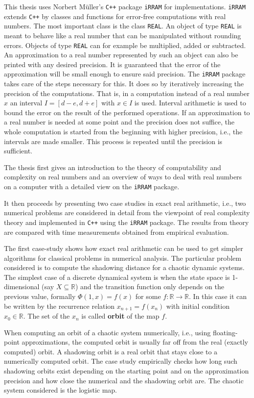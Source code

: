 \documentclass[]{article}
\newcommand{\RR}{\mathbb R}
\newcommand{\code}{\texttt}
\newcommand{\cc}{\code{C++}\xspace}
\newcommand{\irram}{\code{iRRAM}\xspace}
\newcommand{\real}{\code{REAL}\xspace}
\begin{document}
This thesis uses Norbert M\"{u}ller's \cc package \irram for implementations.
\irram extends \cc by classes and functions for error-free computations with
real numbers.
The most important class is the class \real. An object of type \real is meant
to behave like a  real number that can be manipulated without rounding errors.
Objects of type \real can for example be multiplied, added or subtracted.
An approximation to a real number represented by such an object can also be
printed with any desired precision.
It is guaranteed that the error of the approximation will be small enough to
ensure said precision.
The \irram package takes care of the steps necessary for this. 
It does so by iteratively increasing the precision of the computations.
That is, in a computation instead of a real number $x$ an interval $I = [d-e,
d+e]$ with $x \in I$ is used.
Interval arithmetic is used to bound the error on the result of the performed
operations.
If an approximation to a real number is needed at some point and the precision
does not suffice, the whole computation is started from the beginning with
higher precision, i.e., the intervals are made smaller. 
This process is repeated until the precision is sufficient.

The thesis first gives an introduction to the theory of computability and
complexity on real numbers and an overview of ways to deal with real numbers on
a computer with a detailed view on the \irram package.

It then proceeds by presenting two case studies in exact real arithmetic, i.e.,
two numerical problems are considered in detail from the viewpoint of real
complexity theory and implemented in \cc using the \irram package. 
The results from theory are compared with time measurements obtained from
empirical evaluation.

The first case-study shows how exact real arithmetic can be used to get simpler
algorithms for classical problems in numerical analysis.
The particular problem considered is to compute the shadowing distance for a chaotic
dynamic systems.
The simplest case of a discrete dynamical system is when the state space is 1-dimensional (say $X \subseteq \RR$) and 
the transition function only depends on the previous value,
formally $\Phi(1,x) = f(x)$ for some $f : \RR \to \RR$. 
In this case it can be written by the recurrence relation $x_{n+1} = f(x_n)$ with initial condition $x_0 \in \RR$.
The set of the $x_n$ is called \textbf{orbit} of the map $f$.

When computing an orbit of a chaotic system numerically, i.e., using floating-point
approximations, the computed orbit is usually far off from the real (exactly
computed) orbit. 
A shadowing orbit is a real orbit that stays close to a numerically computed
orbit.
The case study empirically checks how long such shadowing orbits exist
depending on the starting point and on the approximation precision and how
close the numerical and the shadowing orbit are.
The chaotic system considered is the logistic map.
\end{document}
